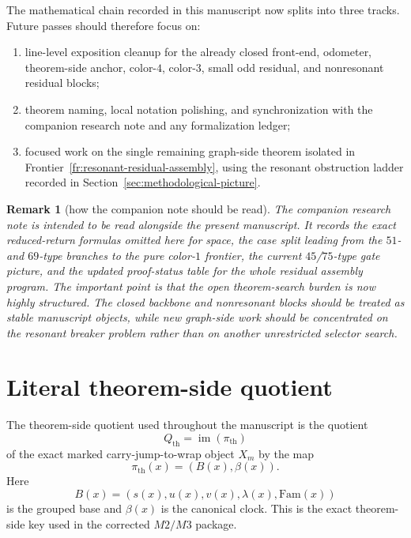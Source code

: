 \documentclass[11pt]{article}
\newtheorem{remark}[theorem]{Remark}
\begin{document}
The mathematical chain recorded in this manuscript now splits into three tracks.
Future passes should therefore focus on:
\begin{enumerate}[label=\textup{(\arabic*)},leftmargin=2.8em]
\item line-level exposition cleanup for the already closed front-end,
      odometer, theorem-side anchor, color-$4$, color-$3$, small odd residual,
      and nonresonant residual blocks;
\item theorem naming, local notation polishing, and synchronization with the
      companion research note and any formalization ledger;
\item focused work on the single remaining graph-side theorem isolated in
      Frontier~\ref{fr:resonant-residual-assembly}, using the resonant
      obstruction ladder recorded in Section~\ref{sec:methodological-picture}.
\end{enumerate}

\begin{remark}[how the companion note should be read]
The companion research note is intended to be read alongside the present
manuscript.
It records the exact reduced-return formulas omitted here for space, the case
split leading from the $51$- and $69$-type branches to the pure color-$1$
frontier, the current $45$/$75$-type gate picture, and the updated proof-status
table for the whole residual assembly program.
The important point is that the open theorem-search burden is now highly
structured.
The closed backbone and nonresonant blocks should be treated as stable
manuscript objects, while new graph-side work should be concentrated on the
resonant breaker problem rather than on another unrestricted selector search.
\end{remark}

\appendix

\section{Literal theorem-side quotient}
\label{app:qth}

The theorem-side quotient used throughout the manuscript is the quotient
\[
Q_{\mathrm{th}}=\operatorname{im}(\pi_{\mathrm{th}})
\]
of the exact marked carry-jump-to-wrap object \(X_m\) by the map
\[
\pi_{\mathrm{th}}(x)=(B(x),\beta(x)).
\]
Here
\[
B(x)=(s(x),u(x),v(x),\lambda(x),\mathrm{Fam}(x))
\]
is the grouped base and \(\beta(x)\) is the canonical clock.
This is the exact theorem-side key used in the corrected \(M2/M3\) package.
\end{document}

